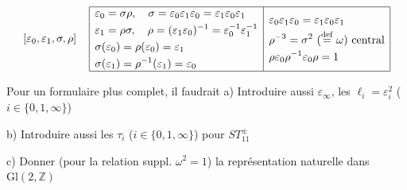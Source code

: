 \documentclass[11pt,a4paper]{article}
\begin{document}
\[
\left[\varepsilon_0, \varepsilon_1, \sigma, \rho\right]
\quad
\begin{array}{|l|l|}
\hline
\begin{aligned}
&\varepsilon_0 = \sigma\rho, \quad \sigma = \varepsilon_0\varepsilon_1\varepsilon_0 = \varepsilon_1\varepsilon_0\varepsilon_1 \\
&\varepsilon_1 = \rho\sigma, \quad \rho = (\varepsilon_1\varepsilon_0)^{-1} = \varepsilon_0^{-1}\varepsilon_1^{-1} \\
&\sigma(\varepsilon_0) = \rho(\varepsilon_0) = \varepsilon_1 \\
&\sigma(\varepsilon_1) = \rho^{-1}(\varepsilon_1) = \varepsilon_0
\end{aligned}
&
\begin{aligned}
&\varepsilon_0\varepsilon_1\varepsilon_0 = \varepsilon_1\varepsilon_0\varepsilon_1 \\
&\rho^{-3} = \sigma^2 \ (\overset{\mathrm{def}}{=} \omega) \ \text{central} \\
&\rho\varepsilon_0\rho^{-1}\varepsilon_0\rho = 1
\end{aligned}
\\ \hline
\end{array}
\]

Pour un formulaire plus complet, il faudrait
a) Introduire aussi $\varepsilon_\infty$, \struck{\ill{}} les $\ell_i = \varepsilon_i^2$ ($i \in \{0, 1, \infty\}$)

b) Introduire aussi les $\tau_i$ ($i \in \{0, 1, \infty\}$) pour $ST_{11}^{\pm}$

c) Donner (pour la relation suppl. $\omega^2 = 1$) la représentation naturelle dans $\mathrm{Gl}(2, \mathbb{Z})$
\end{document}
